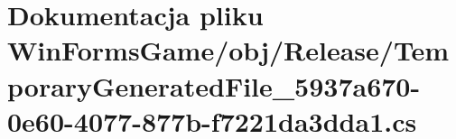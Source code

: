 \hypertarget{_win_forms_game_2obj_2_release_2_temporary_generated_file__5937a670-0e60-4077-877b-f7221da3dda1_8cs}{}\section{Dokumentacja pliku Win\+Forms\+Game/obj/\+Release/\+Temporary\+Generated\+File\+\_\+5937a670-\/0e60-\/4077-\/877b-\/f7221da3dda1.cs}
\label{_win_forms_game_2obj_2_release_2_temporary_generated_file__5937a670-0e60-4077-877b-f7221da3dda1_8cs}
